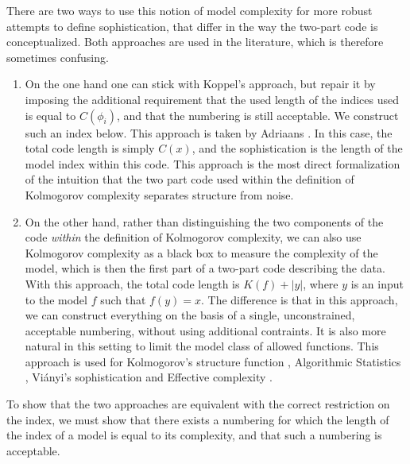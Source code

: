 \documentclass{style/llncs}
\begin{document}
There are two ways to use this notion of model complexity for more robust attempts to define sophistication, that differ in the way the two-part code is conceptualized. Both approaches are used in the literature, which is therefore sometimes confusing.
\begin{enumerate}
  \item On the one hand one can stick with Koppel's approach, but repair it by imposing the additional requirement that the used length of the indices used is equal to $C(\phi_i)$, and that the numbering is still acceptable. We construct such an index below. This approach is taken by Adriaans \cite{adriaans2012facticity}. In this case, the total code length is simply $C(x)$, and the sophistication is the length of the model index within this code. This approach is the most direct formalization of the intuition that the two part code used within the definition of Kolmogorov complexity separates structure from noise.
  \item On the other hand, rather than distinguishing the two components of the code \emph{within} the definition of Kolmogorov complexity, we can also use Kolmogorov complexity as a black box to measure the complexity of the model, which is then the first part of a two-part code describing the data. With this approach, the total code length is $K(f)+|y|$, where $y$ is an input to the model $f$ such that $f(y)=x$. The difference is that in this approach, we can construct everything on the basis of a single, unconstrained, acceptable numbering, without using additional contraints. It is also more natural in this setting to limit the model class of allowed functions. This approach is used for Kolmogorov's structure function \cite{cover1985kolmogorov}, Algorithmic Statistics \cite{gacs2001algorithmic}, Vi\'anyi's sophistication \cite{vitanyi2004meaningful} and Effective complexity \cite{gellmann1996information}.
\end{enumerate}

To show that the two approaches are equivalent with the correct restriction on the index, we must show that there exists a numbering for which the length of the index of a model is equal to its complexity, and that such a numbering is acceptable.
\end{document}
